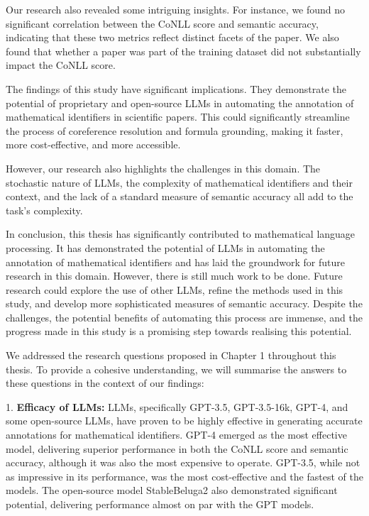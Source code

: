 Our research also revealed some intriguing insights. For instance, we found no significant correlation between the CoNLL score and semantic accuracy, indicating that these two metrics reflect distinct facets of the paper. We also found that whether a paper was part of the training dataset did not substantially impact the CoNLL score.

The findings of this study have significant implications. They demonstrate the potential of proprietary and open-source LLMs in automating the annotation of mathematical identifiers in scientific papers. This could significantly streamline the process of coreference resolution and formula grounding, making it faster, more cost-effective, and more accessible. 

However, our research also highlights the challenges in this domain. The stochastic nature of LLMs, the complexity of mathematical identifiers and their context, and the lack of a standard measure of semantic accuracy all add to the task's complexity. 

In conclusion, this thesis has significantly contributed to mathematical language processing. It has demonstrated the potential of LLMs in automating the annotation of mathematical identifiers and has laid the groundwork for future research in this domain. However, there is still much work to be done. Future research could explore the use of other LLMs, refine the methods used in this study, and develop more sophisticated measures of semantic accuracy. Despite the challenges, the potential benefits of automating this process are immense, and the progress made in this study is a promising step towards realising this potential.

We addressed the research questions proposed in Chapter 1 throughout this thesis. To provide a cohesive understanding, we will summarise the answers to these questions in the context of our findings:

1. \textbf{Efficacy of LLMs:} \ac{LLMs}, specifically GPT-3.5, GPT-3.5-16k, GPT-4, and some open-source LLMs, have proven to be highly effective in generating accurate annotations for mathematical identifiers. GPT-4 emerged as the most effective model, delivering superior performance in both the CoNLL score and semantic accuracy, although it was also the most expensive to operate. GPT-3.5, while not as impressive in its performance, was the most cost-effective and the fastest of the models. The open-source model StableBeluga2 also demonstrated significant potential, delivering performance almost on par with the GPT models.

